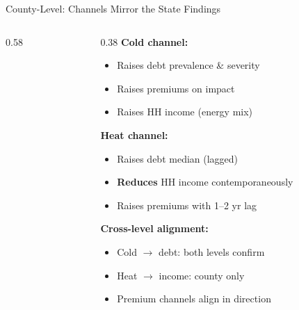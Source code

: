 \documentclass[aspectratio=169,11pt]{beamer}
\newcommand{\emphcolor}[1]{{\color{WarmOrange}\textbf{#1}}}
\newcommand{\tealtext}[1]{{\color{Teal}#1}}
\begin{document}
\begin{frame}{County-Level: Channels Mirror the State Findings}
\begin{columns}[T]
\begin{column}{0.58\textwidth}
\begin{center}
      \end{center}
    \end{column}
    \begin{column}{0.38\textwidth}
      \scriptsize
      \textbf{Cold channel:}
      \begin{itemize}\itemsep0.05em
        \item Raises debt prevalence \& severity
        \item Raises premiums on impact
        \item \tealtext{Raises} HH income (energy mix)
      \end{itemize}
      \vspace{0.1em}
      \textbf{Heat channel:}
      \begin{itemize}\itemsep0.05em
        \item Raises debt median (lagged)
        \item \emphcolor{Reduces} HH income contemporaneously
        \item Raises premiums with 1--2 yr lag
      \end{itemize}
      \vspace{0.1em}
      \textbf{Cross-level alignment:}
      \begin{itemize}\itemsep0.05em
        \item Cold $\to$ debt: both levels confirm
        \item Heat $\to$ income: county only
        \item Premium channels align in direction
      \end{itemize}
    \end{column}
  \end{columns}
\end{frame}
\end{document}
